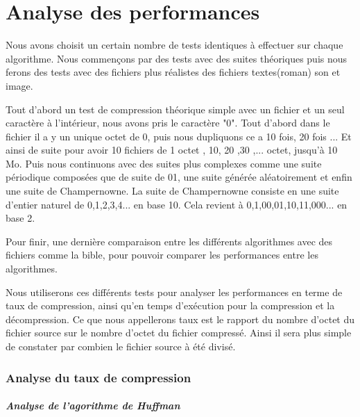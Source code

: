 \documentclass{report}
\begin{document}
\part*{Analyse des performances}
Nous avons choisit un certain nombre de tests identiques à effectuer sur chaque algorithme. Nous commençons par des tests avec des suites théoriques puis nous ferons des tests avec des fichiers plus réalistes des fichiers textes(roman) son et image.
 
Tout d'abord un test de compression théorique simple avec un fichier et un seul caractère à l'intérieur, nous avons pris le caractère "0".
Tout d'abord dans le fichier il a y un unique octet de 0, puis nous dupliquons ce a 10 fois, 20 fois ... Et ainsi de suite pour avoir 10 fichiers de 1 octet , 10, 20 ,30 ,...  octet, jusqu'à 10 Mo.
Puis nous continuons avec des suites plus complexes comme une suite périodique composées que de suite de 01, une suite générée aléatoirement et enfin une suite de Champernowne.
La suite de Champernowne consiste en une suite d'entier naturel de 0,1,2,3,4... en base 10. Cela revient à 0,1,00,01,10,11,000... en base 2.   

Pour finir, une dernière comparaison entre les différents algorithmes avec des fichiers comme la bible, pour pouvoir comparer les performances entre les algorithmes.

Nous utiliserons ces différents tests pour analyser les performances en terme de taux de compression, ainsi qu'en temps d’exécution pour la compression et la décompression. 
Ce que nous appellerons taux est le rapport du nombre d'octet du fichier source sur le nombre d'octet du fichier compressé. Ainsi il sera plus simple de constater par combien le fichier source à été divisé. 
\section*{Analyse du taux de compression}
\subsubsection{ Analyse de l'agorithme de Huffman}
\end{document}
